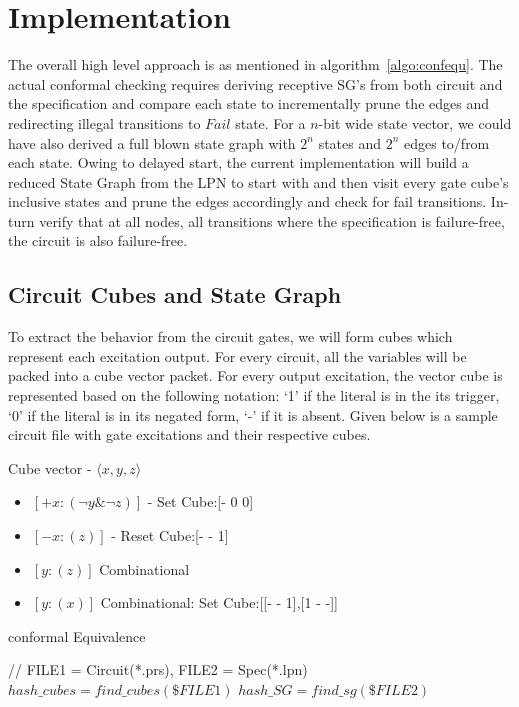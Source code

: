 \documentclass[10pt,journal,compsoc]{IEEEtran}
\begin{document}
\section{Implementation}
The overall high level approach is as mentioned in algorithm~\ref{algo:confequ}. The actual conformal checking requires deriving receptive SG's from both circuit and the specification and compare each state to incrementally prune the edges and redirecting illegal transitions to $Fail$ state. For a $n$-bit wide state vector, we could have also derived a full blown state graph with $2^n$ states and $2^n$ edges to/from each state. Owing to delayed start, the current implementation will build a reduced State Graph from the LPN to start with and then visit every gate cube's inclusive states and prune the edges accordingly and check for fail transitions. In-turn verify that at all nodes, all transitions where the specification is failure-free, the circuit
is also failure-free. 

\subsection{Circuit Cubes and State Graph}
To extract the behavior from the circuit gates, we will form cubes which represent each excitation output. For every circuit, all the variables will be packed into a cube vector packet. For every output excitation, the vector cube is represented based on the following notation: `1' if the literal is in the its trigger, `0' if the literal is in its negated form, `-' if it is absent.
Given below is a sample circuit file with gate excitations and their respective cubes.

Cube vector - $\langle x,y,z \rangle$
\begin{itemize}
\item$[+x: (\neg y \& \neg z)]$ - Set Cube:[- 0 0]\\ 
\item$[-x: (z)]$ - Reset Cube:[- - 1] \\
\item$[ y: (z)]$ Combinational \\
\item$[ y: (x)]$ Combinational: Set Cube:[[- - 1],[1 - -]] 
\end{itemize}

\begin{algorithm}
\caption{conformal Equivalence}
\label{algo:confequ}
\begin{algorithmic}[1]

// FILE1 = Circuit(*.prs), FILE2 = Spec(*.lpn)
\State $hash\_cubes = find\_cubes(\$FILE1)$
\State $hash\_SG = find\_sg(\$FILE2)$
\EndFor
\EndFor 
\EndProcedure
\end{algorithmic}
\end{algorithm}
\end{document}
